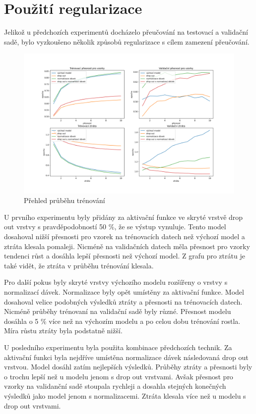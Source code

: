 \documentclass[FM,BP]{tulthesis}
\begin{document}
\section{Použití regularizace}
Jelikož u předchozích experimentů docházelo přeučování na testovací a validační sadě, bylo vyzkoušeno několik způsobů regularizace s cílem zamezení přeučování.

\begin{figure}[!htbp]
\centerline{\includegraphics[scale=.5]{training_course-regularization.png}}
\caption{Přehled průběhu trénování}
\label{fig}
\end{figure}
\FloatBarrier

U prvního experimentu byly přidány za aktivační funkce ve skryté vrstvě drop out vrstvy s pravděpodobností 50 \%, že se výstup vynuluje. Tento model dosahoval nižší přesnosti pro vzorek na trénovacích datech než výchozí model a ztráta klesala pomaleji. Nicméně na validačních datech měla přesnost pro vzorky tendenci růst a dosáhla lepší přesnosti než výchozí model. Z grafu pro ztrátu je také vidět, že ztráta v průběhu trénování klesala. 

Pro další pokus byly skryté vrstvy výchozího modelu rozšířeny o vrstvy s normalizací dávek. Normalizace byly opět umístěny za aktivační funkce. Model dosahoval velice podobných výsledků ztráty a přesnosti na trénovacích datech. Nicméně průběhy trénovaní na validační sadě byly různé. Přesnost modelu dosáhla o 5 \% více než na výchozím modelu a po celou dobu trénování rostla. Míra růstu ztráty byla podstatně nižší. 

U posledního experimentu byla použita kombinace předchozích technik. Za aktivační funkci byla nejdříve umístěna normalizace dávek následovaná drop out vrstvou. Model dosáhl zatím nejlepších výsledků. Průběhy ztráty a přesnosti byly o trochu lepší než u modelu jenom s drop out vrstvami. Avšak přesnost pro vzorky na validanční sadě stoupala rychleji a dosahla stejných konečných výsledků jako model jenom s normalizacemi. Ztráta klesala více než u modelu s drop out vrstvami.
\end{document}
